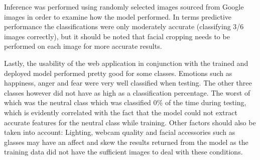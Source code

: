 Inference was performed using randomly selected images sourced from Google images in order to examine how the model performed. In terms predictive performance the classifications were only moderately accurate (classifying 3/6 images correctly), but it should be noted that facial cropping needs to be performed on each image for more accurate results.

Lastly, the usability of the web application in conjunction with the trained and deployed model performed pretty good for some classes. Emotions such as happiness, anger and fear were very well classified when testing. The other three classes however did not have as high as a classification percentage. The worst of which was the neutral class which was classified 0\% of the time during testing, which is evidently correlated with the fact that the model could not extract accurate features for the neutral class while training. Other factors should also be taken into account: Lighting, webcam quality and facial accessories such as glasses may have an affect and skew the results returned from the model as the training data did not have the sufficient images to deal with these conditions.



